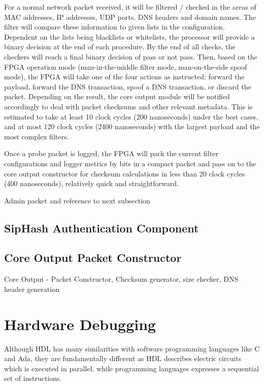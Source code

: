 \documentclass[a4paper]{report}
\begin{document}
For a normal network packet received, it will be filtered / checked in the areas of MAC addresses, IP addresses, UDP ports, DNS headers and domain names. The filter will compare these information to given lists in the configuration. Dependent on the lists being blacklists or whitelists, the processor will provide a binary decision at the end of each procedure. By the end of all checks, the checkers will reach a final binary decision of pass or not pass. Then, based on the FPGA operation mode (man-in-the-middle filter mode, man-on-the-side spoof mode), the FPGA will take one of the four actions as instructed: forward the payload, forward the DNS transaction, spoof a DNS transaction, or discard the packet. Depending on the result, the core output module will be notified accordingly to deal with packet checksums and other relevant metadata. This is estimated to take at least 10 clock cycles (200 nanoseconds) under the best cases, and at most 120 clock cycles (2400 nanoseconds) with the largest payload and the most complex filters.  

Once a probe packet is logged, the FPGA will pack the current filter configurations and logger metrics by bits in a compact packet and pass on to the core output constructor for checksum calculations in less than 20 clock cycles (400 nanoseconds), relatively quick and straightforward.


\newpage

Admin packet and reference to next subsection

\subsection{SipHash Authentication Component}
\label{section:implementation-hardware-implementation-siphash}


\subsection{Core Output Packet Constructor}
Core Output - Packet Constructor, Checksum generator, size checker, DNS header generation


\section{Hardware Debugging}
\label{section:implementation-hardware-debugging}

Although HDL has many similarities with software programming languages like C and Ada, they are fundamentally different as HDL describes electric circuits which is executed in parallel, while programming languages expresses a sequential set of instructions.
\end{document}
